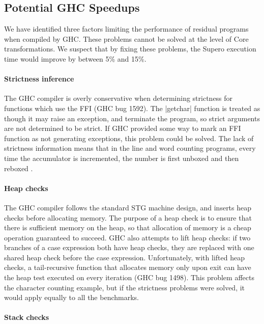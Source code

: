 \subsection{Potential GHC Speedups}


We have identified three factors limiting the performance of residual programs when compiled by GHC. These problems cannot be solved at the level of Core transformations. We suspect that by fixing these problems, the Supero execution time would improve by between 5\% and 15\%.

\paragraph{Strictness inference}

The GHC compiler is overly conservative when determining strictness for functions which use the FFI (GHC bug 1592). The |getchar| function is treated as though it may raise an exception, and terminate the program, so strict arguments are not determined to be strict. If GHC provided some way to mark an FFI function as not generating exceptions, this problem could be solved. The lack of strictness information means that in the line and word counting programs, every time the accumulator is incremented, the number is first unboxed and then reboxed \cite{spj:unboxing}.

\paragraph{Heap checks}

The GHC compiler follows the standard STG machine \cite{spj:implementation} design, and inserts heap checks before allocating memory. The purpose of a heap check is to ensure that there is sufficient memory on the heap, so that allocation of memory is a cheap operation guaranteed to succeed. GHC also attempts to lift heap checks: if two branches of a case expression both have heap checks, they are replaced with one shared heap check before the case expression. Unfortunately, with lifted heap checks, a tail-recursive function that allocates memory only upon exit can have the heap test executed on every iteration (GHC bug 1498). This problem affects the character counting example, but if the strictness problems were solved, it would apply equally to all the benchmarks.

\paragraph{Stack checks}

